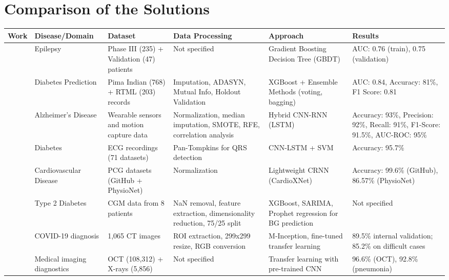 \documentclass[10pt,a4paper]{article}
\begin{document}
\section{Comparison of the Solutions}
\begin{table}[htbp]
\begin{adjustwidth}{-2cm}{-2cm}
\centering
\setlength{\tabcolsep}{4pt}
\renewcommand{\arraystretch}{0.8} 
\scriptsize
\begin{tabular}{|p{1.5cm}|p{2.5cm}|p{3cm}|p{3.5cm}|p{2.5cm}|p{2.5cm}|}
\hline
\textbf{Work} & \textbf{Disease/Domain} & \textbf{Dataset} & \textbf{Data Processing} & \textbf{Approach} & \textbf{Results} \\
\hline
\cite{dejongRealizingVisionPrecision2021} & Epilepsy & Phase III (235) + Validation (47) patients & Not specified & Gradient Boosting Decision Tree (GBDT) & AUC: 0.76 (train), 0.75 (validation) \\
\hline
\cite{tasinDiabetesPredictionUsing2023} & Diabetes Prediction & Pima Indian (768) + RTML (203) records & Imputation, ADASYN, Mutual Info, Holdout Validation & XGBoost + Ensemble Methods (voting, bagging) & AUC: 0.84, Accuracy: 81\%, F1 Score: 0.81 \\
\hline
\cite{sarkarIntegratingMachineLearning2025} & Alzheimer's Disease & Wearable sensors and motion capture data & Normalization, median imputation, SMOTE, RFE, correlation analysis & Hybrid CNN-RNN (LSTM) & Accuracy: 93\%, Precision: 92\%, Recall: 91\%, F1-Score: 91.5\%, AUC-ROC: 95\% \\
\hline
\cite{swapnaDiabetesDetectionUsing2018} & Diabetes & ECG recordings (71 datasets) & Pan-Tompkins for QRS detection & CNN-LSTM + SVM & Accuracy: 95.7\% \\
\hline
\cite{shuvoCardioXNetNovelLightweight2021} & Cardiovascular Disease & PCG datasets (GitHub + PhysioNet) & Normalization & Lightweight CRNN (CardioXNet) & Accuracy: 99.6\% (GitHub), 86.57\% (PhysioNet) \\
\hline
\cite{anjumOptimizingType22024} & Type 2 Diabetes & CGM data from 8 patients & NaN removal, feature extraction, dimensionality reduction, 75/25 split & XGBoost, SARIMA, Prophet regression for BG prediction & Not specified \\
\hline
\cite{wangDeepLearningAlgorithm2021} & COVID-19 diagnosis & 1,065 CT images & ROI extraction, 299x299 resize, RGB conversion & M-Inception, fine-tuned transfer learning & 89.5\% internal validation; 85.2\% on difficult cases \\
\hline
\cite{kermanyIdentifyingMedicalDiagnoses2018} & Medical imaging diagnostics & OCT (108,312) + X-rays (5,856) & Not specified & Transfer learning with pre-trained CNN & 96.6\% (OCT), 92.8\% (pneumonia) \\

\end{tabular}
\end{adjustwidth}
\end{table}
\end{document}
